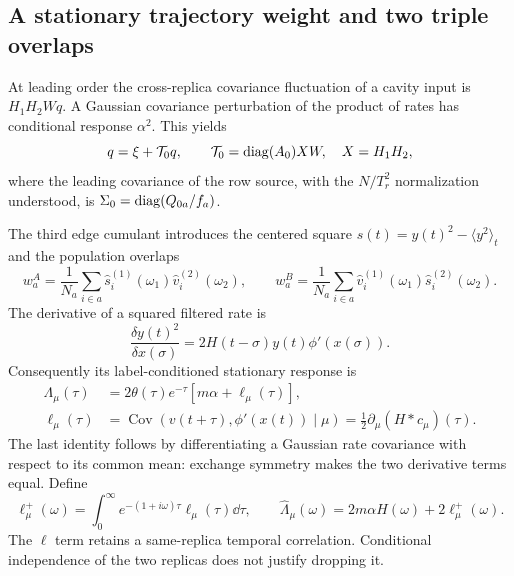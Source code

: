 \subsection{A stationary trajectory weight and two triple overlaps}
At leading order the cross-replica covariance fluctuation of a cavity input is
$H_1H_2Wq$. A Gaussian covariance perturbation of the product of rates has
conditional response $\alpha^2$. This yields
\[
 q=\xi+\mathcal T_0q,\qquad
 \mathcal T_0=\operatorname{diag}(A_0)XW,\quad X=H_1H_2,
\]
where the leading covariance of the row source, with the $N/T_r^2$
normalization understood, is $\Sigma_0=\operatorname{diag}(Q_{0a}/f_a)$.

The third edge cumulant introduces the centered square
$s(t)=y(t)^2-\langle y^2\rangle_t$ and the population overlaps
\[
 w_a^A=\frac1{N_a}\sum_{i\in a}
        \widehat s_i^{(1)}(\omega_1)\widehat v_i^{(2)}(\omega_2),\qquad
 w_a^B=\frac1{N_a}\sum_{i\in a}
        \widehat v_i^{(1)}(\omega_1)\widehat s_i^{(2)}(\omega_2).
\]
The derivative of a squared filtered rate is
\[
 \frac{\delta y(t)^2}{\delta x(\sigma)}
       =2H(t-\sigma)y(t)\phi'(x(\sigma)).
\]
Consequently its label-conditioned stationary response is
\begin{align*}
 \Lambda_\mu(\tau)&=2\theta(\tau)e^{-\tau}
            [m\alpha+\ell_\mu(\tau)],\\
 \ell_\mu(\tau)&=\operatorname{Cov}(v(t+\tau),\phi'(x(t))\mid\mu)
                  =\tfrac12\partial_\mu(H*c_\mu)(\tau).
\end{align*}
The last identity follows by differentiating a Gaussian rate covariance with
respect to its common mean: exchange symmetry makes the two derivative terms
equal. Define
\[
 \ell_\mu^+(\omega)=\int_0^\infty
        e^{-(1+i\omega)\tau}\ell_\mu(\tau)\dd\tau,
 \qquad \widehat\Lambda_\mu(\omega)=2m\alpha H(\omega)+2\ell_\mu^+(\omega).
\]
The $\ell$ term retains a same-replica temporal correlation. Conditional
independence of the two replicas does not justify dropping it.

